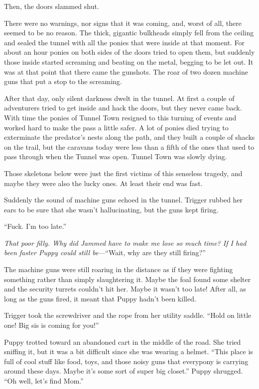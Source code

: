 Then, the doors slammed shut.

There were no warnings, nor signs that it was coming, and, worst of all, there seemed to be no reason. The thick, gigantic bulkheads simply fell from the ceiling and sealed the tunnel with all the ponies that were inside at that moment. For about an hour ponies on both sides of the doors tried to open them, but suddenly those inside started screaming and beating on the metal, begging to be let out. It was at that point that there came the gunshots. The roar of two dozen machine guns that put a stop to the screaming.

After that day, only silent darkness dwelt in the tunnel. At first a couple of adventurers tried to get inside and hack the doors, but they never came back. With time the ponies of Tunnel Town resigned to this turning of events and worked hard to make the pass a little safer. A lot of ponies died trying to exterminate the predator's nests along the path, and they built a couple of shacks on the trail, but the caravans today were less than a fifth of the ones that used to pass through when the Tunnel was open. Tunnel Town was slowly dying.

Those skeletons below were just the first victims of this senseless tragedy, and maybe they were also the lucky ones. At least their end was fast.

Suddenly the sound of machine guns echoed in the tunnel. Trigger rubbed her ears to be sure that she wasn't hallucinating, but the guns kept firing.

``Fuck. I'm too late.''

\emph{That poor filly. Why did Jammed have to make me lose so much time? If I had been faster Puppy could still be}\/---``Wait, why are they still firing?''

The machine guns were still roaring in the distance as if they were fighting something rather than simply slaughtering it. Maybe the foal found some shelter and the security turrets couldn't hit her. Maybe it wasn't too late! After all, as long as the guns fired, it meant that Puppy hadn't been killed.

Trigger took the screwdriver and the rope from her utility saddle. ``Hold on little one! Big sis is coming for you!''


\horizonline


Puppy trotted toward an abandoned cart in the middle of the road. She tried sniffing it, but it was a bit difficult since she was wearing a helmet. ``This place is full of cool stuff like food, toys, and those noisy guns that everypony is carrying around these days. Maybe it's some sort of super big closet.'' Puppy shrugged. ``Oh well, let's find Mom.''


